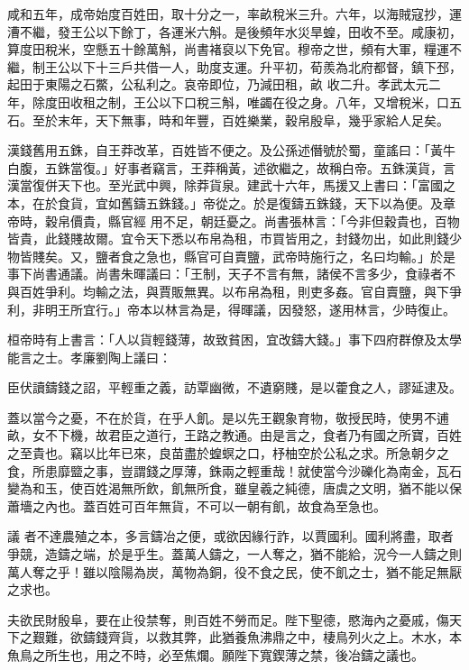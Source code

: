 \begin{pinyinscope}
 咸和五年，成帝始度百姓田，取十分之一，率畝稅米三升。六年，以海賊寇抄，運漕不繼，發王公以下餘丁，各運米六斛。是後頻年水災旱蝗，田收不至。咸康初，算度田稅米，空懸五十餘萬斛，尚書褚裒以下免官。穆帝之世，頻有大軍，糧運不繼，制王公以下十三戶共借一人，助度支運。升平初，荀羨為北府都督，鎮下邳，起田于東陽之石鱉，公私利之。哀帝即位，乃減田租，畝
 收二升。孝武太元二年，除度田收租之制，王公以下口稅三斛，唯蠲在役之身。八年，又增稅米，口五石。至於末年，天下無事，時和年豐，百姓樂業，穀帛殷阜，幾乎家給人足矣。



 漢錢舊用五銖，自王莽改革，百姓皆不便之。及公孫述僭號於蜀，童謠曰：「黃牛白腹，五銖當復。」好事者竊言，王莽稱黃，述欲繼之，故稱白帝。五銖漢貨，言漢當復併天下也。至光武中興，除莽貨泉。建武十六年，馬援又上書曰：「富國之本，在於食貨，宜如舊鑄五銖錢。」帝從之。於是復鑄五銖錢，天下以為便。及章帝時，穀帛價貴，縣官經
 用不足，朝廷憂之。尚書張林言：「今非但穀貴也，百物皆貴，此錢賤故爾。宜令天下悉以布帛為租，市買皆用之，封錢勿出，如此則錢少物皆賤矣。又，鹽者食之急也，縣官可自賣鹽，武帝時施行之，名曰均輸。」於是事下尚書通議。尚書朱暉議曰：「王制，天子不言有無，諸侯不言多少，食祿者不與百姓爭利。均輸之法，與賈販無異。以布帛為租，則吏多姦。官自賣鹽，與下爭利，非明王所宜行。」帝本以林言為是，得暉議，因發怒，遂用林言，少時復止。



 桓帝時有上書言：「人以貨輕錢薄，故致貧困，宜改鑄大錢。」事下四府群僚及太學能言之士。孝廉劉陶上議曰：



 臣伏讀鑄錢之詔，平輕重之義，訪覃幽微，不遺窮賤，是以藿食之人，謬延逮及。



 蓋以當今之憂，不在於貨，在乎人飢。是以先王觀象育物，敬授民時，使男不逋畝，女不下機，故君臣之道行，王路之教通。由是言之，食者乃有國之所寶，百姓之至貴也。竊以比年已來，良苗盡於蝗螟之口，杼柚空於公私之求。所急朝夕之食，所患靡盬之事，豈謂錢之厚薄，銖兩之輕重哉！就使當今沙礫化為南金，瓦石變為和玉，使百姓渴無所飲，飢無所食，雖皇羲之純德，唐虞之文明，猶不能以保蕭墻之內也。蓋百姓可百年無貨，不可以一朝有飢，故食為至急也。



 議
 者不達農殖之本，多言鑄冶之便，或欲因緣行詐，以賈國利。國利將盡，取者爭競，造鑄之端，於是乎生。蓋萬人鑄之，一人奪之，猶不能給，況今一人鑄之則萬人奪之乎！雖以陰陽為炭，萬物為銅，役不食之民，使不飢之士，猶不能足無厭之求也。



 夫欲民財殷阜，要在止役禁奪，則百姓不勞而足。陛下聖德，愍海內之憂戚，傷天下之艱難，欲鑄錢齊貨，以救其弊，此猶養魚沸鼎之中，棲鳥列火之上。木水，本魚鳥之所生也，用之不時，必至焦爛。願陛下寬鍥薄之禁，後冶鑄之議也。




\end{pinyinscope}

